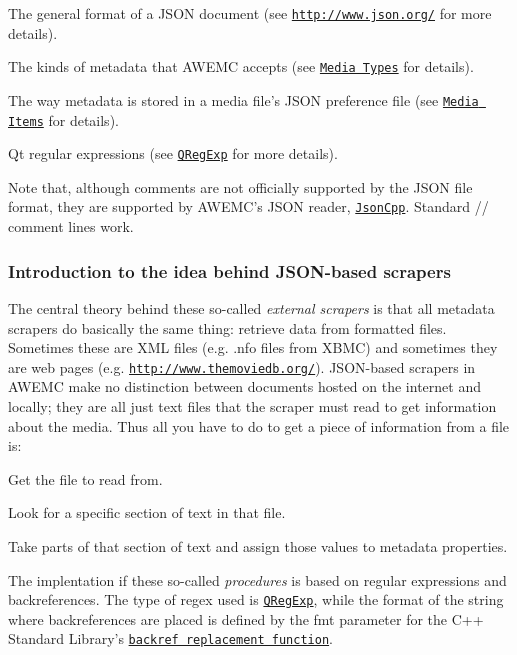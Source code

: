 \begin{DoxyItemize}
\item The general format of a J\-S\-O\-N document (see \href{http://www.json.org/}{\tt http\-://www.\-json.\-org/} for more details).
\item The kinds of metadata that A\-W\-E\-M\-C accepts (see \href{../type/README.md>}{\tt Media Types} for details).
\item The way metadata is stored in a media file's J\-S\-O\-N preference file (see \href{../items/README.md>}{\tt Media Items} for details).
\item Qt regular expressions (see \href{http://qt-project.org/doc/qt-5/qregexp.html>}{\tt Q\-Reg\-Exp} for more details).
\end{DoxyItemize}

Note that, although comments are not officially supported by the J\-S\-O\-N file format, they are supported by A\-W\-E\-M\-C's J\-S\-O\-N reader, \href{http://jsoncpp.sourceforge.net/>}{\tt Json\-Cpp}. Standard {\ttfamily // comment} lines work.

\subsubsection*{Introduction to the idea behind J\-S\-O\-N-\/based scrapers}

The central theory behind these so-\/called {\itshape external scrapers} is that all metadata scrapers do basically the same thing\-: retrieve data from formatted files. Sometimes these are X\-M\-L files (e.\-g. .nfo files from X\-B\-M\-C) and sometimes they are web pages (e.\-g. \href{http://www.themoviedb.org/}{\tt http\-://www.\-themoviedb.\-org/}). J\-S\-O\-N-\/based scrapers in A\-W\-E\-M\-C make no distinction between documents hosted on the internet and locally; they are all just text files that the scraper must read to get information about the media. Thus all you have to do to get a piece of information from a file is\-:


\begin{DoxyEnumerate}
\item Get the file to read from.
\item Look for a specific section of text in that file.
\item Take parts of that section of text and assign those values to metadata properties.
\end{DoxyEnumerate}

The implentation if these so-\/called {\itshape procedures} is based on regular expressions and backreferences. The type of regex used is \href{http://qt-project.org/doc/qt-5/qregexp.html>}{\tt Q\-Reg\-Exp}, while the format of the string where backreferences are placed is defined by the {\ttfamily fmt} parameter for the C++ Standard Library's \href{http://www.cplusplus.com/reference/regex/match_replace/}{\tt backref replacement function}.

